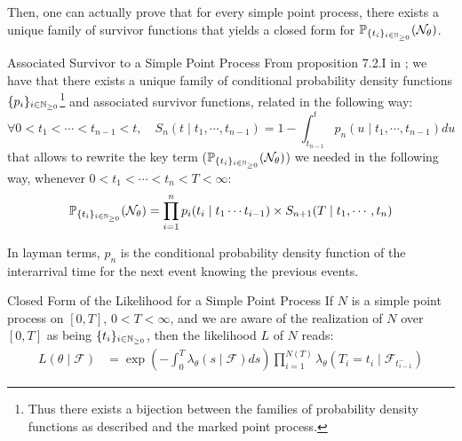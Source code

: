 \documentclass[11pt]{book}
\newcommand{\sequence}[1]{\{ #1 \}_{ i \in \N} }
\begin{document}
Then, one can actually prove that for every simple point process, there exists a unique family of survivor functions that yields a closed form for $\mathbb P_{\sequence{t_i}} ( \mathcal N_{\theta} )$.

\begin{theoreme}{Associated Survivor to a Simple Point Process}
From proposition 7.2.I in \cite{daley}; we have that there exists a unique family of conditional probability density functions $\sequence{p_i}$\footnote{Thus there exists a bijection between the families of probability density functions as described and the marked point process.} and associated survivor functions, related in the following way:
\begin{equation}
\forall 0 < t_1 < \cdots < t_{n-1} < t, \quad S_n( t \mid t_1, \cdots, t_{n-1} ) = 1 - \int_{t_{n-1}}^t p_n ( u \mid t_1, \cdots, t_{n-1} ) du
\end{equation}
that allows to rewrite the key term ($\mathbb P_{\sequence{t_i}} ( \mathcal N_{\theta} )$) we needed in the following way, whenever $0 < t_1 < \cdots < t_{n} < T < \infty $:
\begin{equation}
\mathbb P_{\sequence{t_i}} ( \mathcal N_{\theta} )  =   \prod_{i = 1}^n p_i ( t_i \mid t_1 \cdots t_{i-1} ) \times S_{n+1} ( T \mid t_1, \cdots, t_n )  
\end{equation}
\end{theoreme}


\begin{remarque}
In layman terms, $p_n$ is the conditional probability density function of the interarrival time for the next event knowing the previous events.
\end{remarque}


\begin{theoreme}[label = theoreme_expression_ln_lik]{Closed Form of the Likelihood for a Simple Point Process}
If $N$ is a simple point process on $[0,T]$,  $0 < T < \infty$, and we are aware of the realization of $N$ over $[0,T]$ as being $\sequence{t_i}$, then the likelihood $L$ of $N$ reads:
\begin{align}
L( \theta \mid \mathcal F ) &= \exp \left ( - \int_{0}^{T} \lambda_{\theta} ( s \mid \mathcal F ) ds \right )  \prod_{i=1}^{N(T)}  \lambda_{\theta} ( T_i = t_i \mid \mathcal F_{t_{i-1}^-} )  
\end{align}
\end{theoreme}
\end{document}
